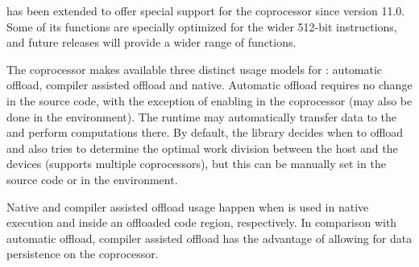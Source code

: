\documentclass[../thesis]{subfiles}
\begin{document}
	\intel\mkl has been extended to offer special support for the \intel\xeonphi coprocessor since version 11.0. Some of its functions are specially optimized for the wider 512-bit \simd instructions, and future releases will provide a wider range of functions.

	The coprocessor makes available three distinct usage models for \mkl: automatic offload, compiler assisted offload and native. Automatic offload requires no change in the source code, with the exception of enabling \mkl in the coprocessor (may also be done in the environment). The runtime may automatically transfer data to the \xeonphi and perform computations there. By default, the library decides when to offload and also tries to determine the optimal work division between the host and the devices (\mkl supports multiple coprocessors), but this can be manually set in the source code or in the environment.

	Native and compiler assisted offload usage happen when \mkl is used in native execution and inside an offloaded code region, respectively. In comparison with automatic offload, compiler assisted offload has the advantage of allowing for data persistence on the coprocessor.
\end{document}

